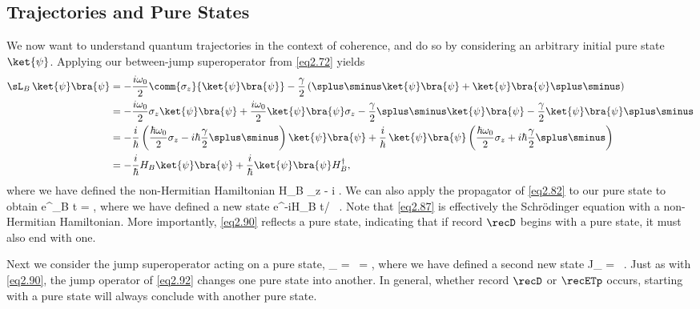 \subsection{Trajectories and Pure States}
We now want to understand quantum trajectories in the context of coherence, and do so by considering an arbitrary initial pure state $\ket{\psi}$. Applying our between-jump superoperator from \eqref{eq2.72} yields
%
\begin{align} \sL_B \, \ket{\psi} \bra{\psi} &= -\frac{i\omega_0}{2} \comm{\sigma_z}{\ket{\psi} \bra{\psi}} - \frac{\gamma}{2} \left( \splus\sminus \ket{\psi} \bra{\psi} + \ket{\psi} \bra{\psi} \splus\sminus \right) \nonumber \\
&= -\frac{i\omega_0}{2} \sigma_z \ket{\psi} \bra{\psi} + \frac{i\omega_0}{2} \ket{\psi} \bra{\psi} \sigma_z - \frac{\gamma}{2} \splus\sminus \ket{\psi} \bra{\psi} - \frac{\gamma}{2} \ket{\psi} \bra{\psi} \splus\sminus \nonumber \\
&= -\frac{i}{\hbar} \left( \frac{\hbar\omega_0}{2} \sigma_z - i\hbar \frac{\gamma}{2} \splus\sminus \right) \ket{\psi} \bra{\psi} + \frac{i}{\hbar} \, \ket{\psi} \bra{\psi} \left( \frac{\hbar\omega_0}{2} \sigma_z + i\hbar \frac{\gamma}{2} \splus\sminus \right) \nonumber \\
&= -\frac{i}{\hbar} H_B \ket{\psi} \bra{\psi} + \frac{i}{\hbar} \ket{\psi} \bra{\psi} H^{\dag}_B, \label{eq2.87} \end{align}
%
where we have defined the non-Hermitian Hamiltonian
%
\be H_B \equiv {} \sigma_z - i\hbar {} \splus\sminus. \label{eq2.88} \ee
%
We can also apply the propagator of \eqref{eq2.82} to our pure state to obtain
%
\be e^{\sL_B t} \ket{\psi} \bra{\psi} =  , \label{eq2.89} \ee
%
where we have defined a new state
%
\be {} \equiv e^{-iH_B t/\hbar} \, \ket{\psi}. \label{eq2.90} \ee
%
Note that \eqref{eq2.87} is effectively the Schr\"{o}dinger equation with a non-Hermitian Hamiltonian. More importantly, \eqref{eq2.90} reflects a pure state, indicating that if record $\recD$ begins with a pure state, it must also end with one.

Next we consider the jump superoperator acting on a pure state,
%
\be \sL_{\gamma} \ket{\psi} \bra{\psi} = \gamma \, \sminus \ket{\psi} \bra{\psi} \splus = \ket{\psi_{\gamma}} \bra{\psi_{\gamma}}, \label{eq2.91} \ee
%
where we have defined a second new state
%
\be \ket{\psi_{\gamma}} \equiv J_{\gamma} \ket{\psi} = \sqrt{\gamma} \, \sminus \ket{\psi}. \label{eq2.92} \ee
%
Just as with \eqref{eq2.90}, the jump operator of \eqref{eq2.92} changes one pure state into another. In general, whether record $\recD$ or $\recETp$ occurs, starting with a pure state will always conclude with another pure state.

